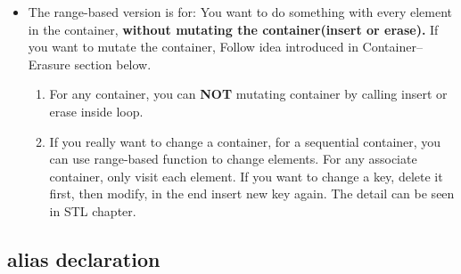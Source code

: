 \documentclass[a4paper,11pt,twoside]{book}
\begin{document}
\begin{itemize}
\begin{enumerate}
	\end{enumerate}
	
	
%
	
	
	\item The range-based version is for: You want to do something with every element in the container, \textbf{without mutating the container(insert or erase).} If you want to mutate the container, Follow idea introduced in Container--Erasure section below.
	
	\begin{enumerate}
		\item For any container, you can \textbf{NOT} mutating container by calling insert or erase inside loop.
		
		\item If you really want to change a container, for a sequential container, you can use range-based function to change elements. For any associate container, only visit each element. If you want to change a key, delete it first, then modify, in the end insert new key again. The detail can be seen in STL chapter. 
	\end{enumerate}
	
\end{itemize}

\subsection{alias declaration}
\end{document}
